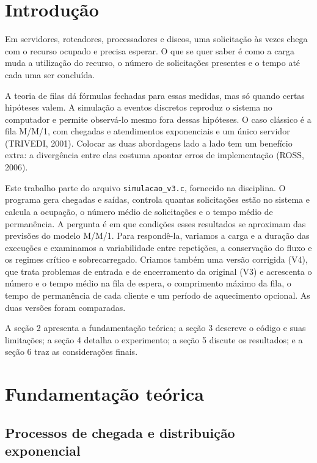 \documentclass[
  article,      %
  10pt,         %
  oneside,
  a4paper,
  twocolumn,    %
  english,
  brazil        %
]{abntex2}
\begin{document}
\section{Introdução}

Em servidores, roteadores, processadores e discos, uma solicitação às vezes chega com o recurso ocupado e precisa esperar. O que se quer saber é como a carga muda a utilização do recurso, o número de solicitações presentes e o tempo até cada uma ser concluída.

A teoria de filas dá fórmulas fechadas para essas medidas, mas só quando certas hipóteses valem. A simulação a eventos discretos reproduz o sistema no computador e permite observá-lo mesmo fora dessas hipóteses. O caso clássico é a fila M/M/1, com chegadas e atendimentos exponenciais e um único servidor (TRIVEDI, 2001). Colocar as duas abordagens lado a lado tem um benefício extra: a divergência entre elas costuma apontar erros de implementação (ROSS, 2006).

Este trabalho parte do arquivo \texttt{simulacao\_v3.c}, fornecido na disciplina. O programa gera chegadas e saídas, controla quantas solicitações estão no sistema e calcula a ocupação, o número médio de solicitações e o tempo médio de permanência. A pergunta é em que condições esses resultados se aproximam das previsões do modelo M/M/1. Para respondê-la, variamos a carga e a duração das execuções e examinamos a variabilidade entre repetições, a conservação do fluxo e os regimes crítico e sobrecarregado. Criamos também uma versão corrigida (V4), que trata problemas de entrada e de encerramento da original (V3) e acrescenta o número e o tempo médio na fila de espera, o comprimento máximo da fila, o tempo de permanência de cada cliente e um período de aquecimento opcional. As duas versões foram comparadas.

A seção 2 apresenta a fundamentação teórica; a seção 3 descreve o código e suas limitações; a seção 4 detalha o experimento; a seção 5 discute os resultados; e a seção 6 traz as considerações finais.


\section{Fundamentação teórica}

\subsection{Processos de chegada e distribuição exponencial}
\end{document}
